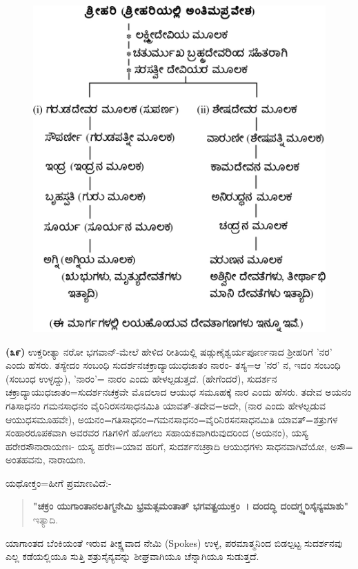 \begin{figure}[!htbp]
\includegraphics[scale=.23]{images/fig2.jpg}
\end{figure}

\textbf{(೩೯)} ಉಕ್ತರೀತ್ಯಾ ನರೋ ಭಗವಾನ್-ಮೇಲೆ ಹೇಳಿದ ರೀತಿಯಲ್ಲಿ ಷಡ್ಗುಣೈಶ್ವರ್ಯಪೂರ್ಣನಾದ ಶ‍್ರೀಹರಿಗೆ 'ನರ' ಎಂದು ಹೆಸರು. ತಸ್ಯೇದಂ ಸಂಬಂಧಿ ಸುದರ್ಶನಚಕ್ರಾದ್ಯಾಯುಧಜಾತಂ ನಾರಂ- ತಸ್ಯ=ಆ 'ನರ' ನ, ಇದಂ ಸಂಬಂಧಿ (ಸಂಬಂಧ ಉಳ್ಳದ್ದು), 'ನಾರಂ'= ನಾರಂ ಎಂದು ಹೇಳಲ್ಪಡುತ್ತದೆ. (ಹೇಗೆಂದರೆ), ಸುದರ್ಶನ ಚಕ್ರಾದ್ಯಾಯುಧ\-ಜಾತಂ=ಸುದರ್ಶನಚಕ್ರವೇ ಮೊದಲಾದ ಆಯುಧ ಸಮೂಹಕ್ಕೆ ನಾರ ಎಂದು ಹೆಸರು. ತದೇವ ಅಯನಂ ಗತಿಸಾಧನಂ ಗಮನಸಾಧನಂ ವೈರಿನಿರಸನಸಾಧನಮಿತಿ ಯಾವತ್-ತದೇವ=ಅದೇ, (ನಾರ ಎಂದು ಹೇಳಲ್ಪಡುವ ಆಯುಧಸಮೂಹವೇ), ಅಯನಂ=ಗತಿಸಾಧನಂ=ಗಮನ\-ಸಾಧನಂ=ವೈರಿನಿರಸನಸಾಧನಮಿತಿ ಯಾವತ್=ಶತ್ರುಗಳ ಸಂಹಾರರೂಪಕವಾಗಿ ಅವರವರ ಗತಿಗಳಿಗೆ ಹೋಗಲು ಸಹಾಯಕವಾಗಿರುವುದರಿಂದ (ಅಯನಂ), ಯಸ್ಯ ಹರೇರಸೌ‌\break ನಾರಾಯಣಃ\-- ಯಸ್ಯ ಹರೇಃ=ಯಾವ ಹರಿಗೆ, ಸುದರ್ಶನಚಕ್ರಾದಿ ಆಯುಧಗಳು ಸಾಧನವಾಗಿವೆಯೋ, ಅಸೌ= ಅಂತಹವನು, ನಾರಾಯಣ.

ಯಥೋಕ್ತಂ=ಹೀಗೆ ಪ್ರಮಾಣವಿದೆ:-

\begin{verse}
\textbf{"ಚಕ್ರಂ ಯುಗಾಂತಾನಲತಿಗ್ಮನೇಮಿ ಭ್ರಮತ್ಸಮಂತಾತ್ ಭಗವತ್ಪ್ರಯುಕ್ತಂ~। ದಂದದ್ಧಿ ದಂದಗ್ಧ್ಯರಿಸೈನ್ಯಮಾಶು"} ಇತ್ಯಾದಿ.
\end{verse}

\noindent
ಯಾಗಾಂತದ ಬೆಂಕಿಯಂತೆ ಇರುವ ತೀಕ್ಷ್ಣವಾದ ನೇಮಿ (Spokes) ಉಳ್ಳ, ಪರಮಾತ್ಮನಿಂದ ಬಿಡಲ್ಪಟ್ಟ ಸುದರ್ಶನವು ಎಲ್ಲ ಕಡೆಯಲ್ಲಿಯೂ ಸುತ್ತಿ ಶತ್ರುಸೈನ್ಯವನ್ನು ಶೀಘ್ರವಾಗಿಯೂ ಚೆನ್ನಾಗಿಯೂ ಸುಡುತ್ತದೆ.

